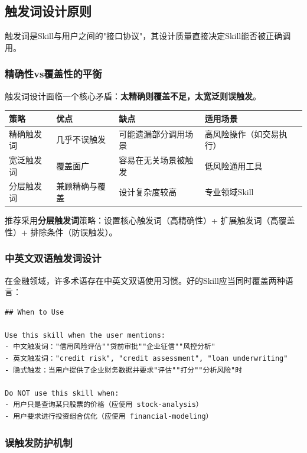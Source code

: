 \subsection{触发词设计原则}

触发词是Skill与用户之间的"接口协议"，其设计质量直接决定Skill能否被正确调用。

\subsubsection{精确性vs覆盖性的平衡}

触发词设计面临一个核心矛盾：\textbf{太精确则覆盖不足，太宽泛则误触发}。

\begin{table}[H]
\centering
\begin{tabular}{lp{4cm}p{4cm}p{3cm}}
\toprule
\textbf{策略} & \textbf{优点} & \textbf{缺点} & \textbf{适用场景} \\
\midrule
精确触发词 & 几乎不误触发 & 可能遗漏部分调用场景 & 高风险操作（如交易执行） \\
宽泛触发词 & 覆盖面广 & 容易在无关场景被触发 & 低风险通用工具 \\
分层触发词 & 兼顾精确与覆盖 & 设计复杂度较高 & 专业领域Skill \\
\bottomrule
\end{tabular}
\end{table}

推荐采用\textbf{分层触发词}策略：设置核心触发词（高精确性）+ 扩展触发词（高覆盖性）+ 排除条件（防误触发）。

\subsubsection{中英文双语触发词设计}

在金融领域，许多术语存在中英文双语使用习惯。好的Skill应当同时覆盖两种语言：

\begin{lstlisting}
## When to Use

Use this skill when the user mentions:
- 中文触发词："信用风险评估""贷前审批""企业征信""风控分析"
- 英文触发词："credit risk", "credit assessment", "loan underwriting"
- 隐式触发：当用户提供了企业财务数据并要求"评估""打分""分析风险"时

Do NOT use this skill when:
- 用户只是查询某只股票的价格（应使用 stock-analysis）
- 用户要求进行投资组合优化（应使用 financial-modeling）
\end{lstlisting}

\subsubsection{误触发防护机制}


